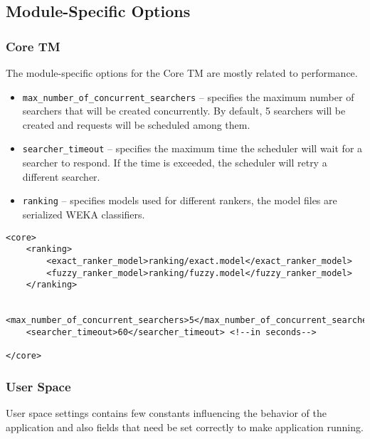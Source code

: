 \subsection{Module-Specific Options}

\subsubsection{Core TM}

The module-specific options for the Core TM are mostly related to performance.

\begin{itemize}
        \item \verb#max_number_of_concurrent_searchers# -- specifies the maximum number of searchers that will be created concurrently. By default, 5 searchers will be created and requests will be scheduled among them.
        \item \verb#searcher_timeout# -- specifies the maximum time the scheduler will wait for a searcher to respond. If the time is exceeded, the scheduler will retry a different searcher.
        \item \verb#ranking# -- specifies models used for different rankers, the model files are serialized WEKA classifiers.

\end{itemize}

\begin{lstlisting}
<core>
    <ranking>
        <exact_ranker_model>ranking/exact.model</exact_ranker_model>
        <fuzzy_ranker_model>ranking/fuzzy.model</fuzzy_ranker_model>
    </ranking>

    <max_number_of_concurrent_searchers>5</max_number_of_concurrent_searchers>
    <searcher_timeout>60</searcher_timeout> <!--in seconds-->

</core>

\end{lstlisting}

\subsubsection{User Space}

User space settings contains few constants influencing the behavior of the application and also fields that need be set correctly to make application running.

